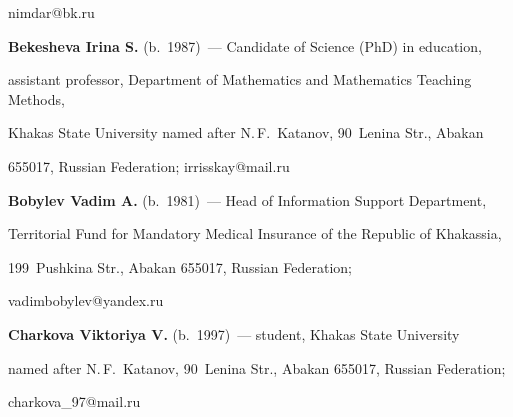 \mbox{nimdar@bk.ru}





\vspace*{1pt}





  \noindent


\textbf{Bekesheva Irina S.} (b.\ 1987)~--- Candidate of Science (PhD) in education, 


assistant professor, Department of Mathematics and Mathematics Teaching Methods, 


Khakas State University named after N.\,F.~Katanov, 90~Lenina Str., Abakan 


655017, Russian Federation; \mbox{irrisskay@mail.ru} 





\vspace*{1pt}








  \noindent


\textbf{Bobylev Vadim A.} (b.\ 1981)~--- Head of Information Support Department, 


Territorial Fund for Mandatory Medical Insurance of the Republic of Khakassia, 


199~Pushkina Str., Abakan 655017, Russian Federation; 


\mbox{vadimbobylev@yandex.ru}





\vspace*{1pt}





  \noindent


  \textbf{Charkova Viktoriya V.} (b.\ 1997)~--- student, Khakas State University 


named after N.\,F.~Katanov, 90~Lenina Str., Abakan 655017, Russian Federation; 


\mbox{charkova\_97@mail.ru}


\label{end\stat}








\renewcommand{\bibname}{\protect\rm Литература}


